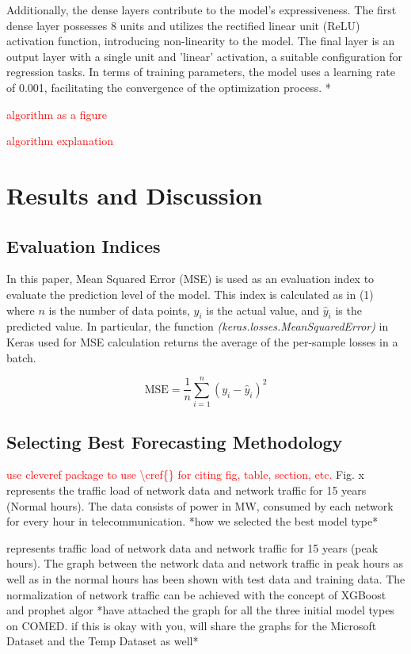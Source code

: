 \documentclass[conference]{IEEEtran}
\begin{document}
Additionally, the dense layers contribute to the model's expressiveness. The first dense layer possesses 8 units and utilizes the rectified linear unit (ReLU) activation function, introducing non-linearity to the model. The final layer is an output layer with a single unit and 'linear' activation, a suitable configuration for regression tasks. In terms of training parameters, the model uses a learning rate of 0.001, facilitating the convergence of the optimization process.
*

\textcolor{red}{algorithm as a figure}

\textcolor{red}{algorithm explanation}

\section{Results and Discussion}

\subsection{Evaluation Indices}

In this paper, Mean Squared Error (MSE) is used as an evaluation index to evaluate the prediction level of the model. This index is calculated as in (1) where $n$ is the number of data points, $y_i$ is the actual value, and $\hat{y}_i$ is the predicted value. In particular, the function \textit{(keras.losses.MeanSquaredError)} in Keras used for MSE calculation returns the average of the per-sample losses in a batch.

\begin{equation}
\text{MSE} = \frac{1}{n} \sum_{i=1}^{n} (y_i - \hat{y}_i)^2
\end{equation}

\subsection{Selecting Best Forecasting Methodology}

\textcolor{red}{use cleveref package to use \textbackslash cref\{\} for citing fig, table, section, etc.} Fig. x represents the traffic load of network data and network traffic for 15 years (Normal hours). The data consists of power in MW, consumed by each network for every hour in telecommunication.
*how we selected the best model type*

represents traffic load of network data and network traffic for 15 years (peak hours). The graph between the network data and network traffic in peak hours as well as in the normal hours has been shown with test data and training data. The normalization of network traffic can be achieved with the concept of XGBoost and prophet algor
*have attached the graph for all the three initial model types on COMED. if this is okay with you, will share the graphs for the Microsoft Dataset and the Temp Dataset as well*
\end{document}
